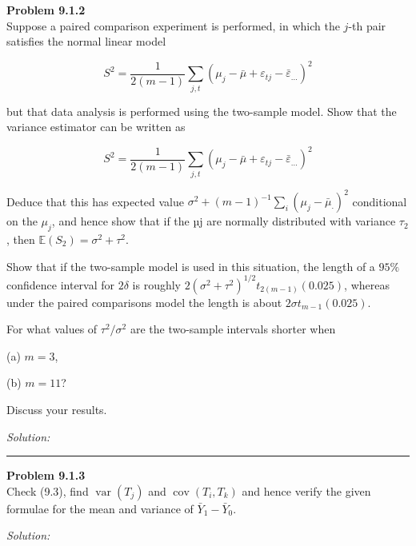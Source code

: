 \documentclass[a4paper, 11pt]{article}
\newenvironment{problem}[2][Problem]
    { \begin{mdframed}[backgroundcolor=gray!20] \textbf{#1 #2} \\}
    {  \end{mdframed}}
\newenvironment{solution}
    {\textit{Solution:}}
    {}
\begin{document}
\begin{problem}{9.1.2}
Suppose a paired comparison experiment is performed, in which the $j$-th pair satisfies the normal linear model

$$S^{2}=\frac{1}{2(m-1)} \sum_{j, t}\left(\mu_{j}-\bar{\mu}+\varepsilon_{t j}-\bar{\varepsilon}_{\ldots}\right)^{2}$$

but that data analysis is performed using the two-sample model. Show that the variance estimator can be written as

$$S^{2}=\frac{1}{2(m-1)} \sum_{j, t}\left(\mu_{j}-\bar{\mu}+\varepsilon_{t j}-\bar{\varepsilon}_{\ldots}\right)^{2}$$

Deduce that this has expected value $\sigma^{2}+(m-1)^{-1} \sum_{i}\left(\mu_{j}-\bar{\mu}_{\cdot}\right)^{2}$ conditional on the $\mu_j$, and hence show that if the µj are normally distributed with variance $\tau_2$, then $\mathbb{E}(S_2) =\sigma^{2}+\tau^{2}$.

Show that if the two-sample model is used in this situation, the length of a $95\%$ confidence interval for $2\delta$ is roughly $2\left(\sigma^{2}+\tau^{2}\right)^{1 / 2} t_{2(m-1)}(0.025)$, whereas under the paired comparisons model the length is about $2 \sigma t_{m-1}(0.025)$. 

For what values of $\tau^{2} / \sigma^{2}$ are the two-sample intervals shorter when 

(a) $m = 3$, 

(b) $m = 11$? 

Discuss your results.
\end{problem}
\begin{solution}
\end{solution} 

\noindent\rule{7in}{2.8pt}

\begin{problem}{9.1.3}
	Check (9.3), find $\operatorname{var}\left(T_{j}\right)$ and $\operatorname{cov}\left(T_{i}, T_{k}\right)$ and hence verify the given formulae for the mean and variance of $\bar{Y}_{1}-\bar{Y}_{0}$.
\end{problem}
\begin{solution}
\end{solution} 
\end{document}
